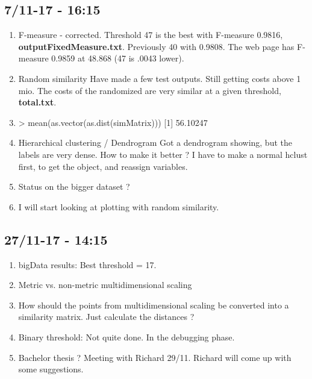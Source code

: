 \documentclass[a4paper,10pt]{article}
\begin{document}
\subsection{7/11-17 - 16:15}

\begin{enumerate}
	\item F-measure - corrected. Threshold 47 is the best with F-measure 0.9816, \textbf{outputFixedMeasure.txt}. Previously 40 with 0.9808. The web page has F-measure 0.9859 at 48.868 (47 is .0043 lower). 
	\item Random similarity
	\subitem Have made a few test outputs. Still getting costs above 1 mio.
	\subitem The costs of the randomized are very similar at a given threshold, \textbf{total.txt}.
	\item > mean(as.vector(as.dist(simMatrix)))
	[1] 56.10247
	\item Hierarchical clustering / Dendrogram
	\subitem Got a dendrogram showing, but the labels are very dense. How to make it better ?
	\subitem I have to make a normal hclust first, to get the object, and reassign variables.
	\item Status on the bigger dataset ?
	\item I will start looking at plotting with random similarity.
\end{enumerate}

\subsection{27/11-17 - 14:15}

\begin{enumerate}
	\item bigData results: Best threshold = 17.
	\item Metric vs. non-metric multidimensional scaling
	\item How should the points from multidimensional scaling be converted into a similarity matrix. Just calculate the distances ?
	
	\item Binary threshold: Not quite done. In the debugging phase.
	
	\item Bachelor thesis ? 
	\subitem Meeting with Richard 29/11. Richard will come up with some suggestions.
\end{enumerate}
\end{document}
